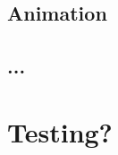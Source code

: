 \documentclass{l4proj}
\begin{document}
\subsection{Animation}
\subsection{...}
\section{Testing?}
  



\end{document}

